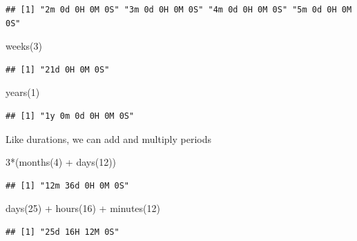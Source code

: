 \documentclass[
]{book}
\newenvironment{Shaded}{\begin{snugshade}}{\end{snugshade}}
\newcommand{\DecValTok}[1]{\textcolor[rgb]{0.00,0.00,0.81}{#1}}
\newcommand{\FunctionTok}[1]{\textcolor[rgb]{0.00,0.00,0.00}{#1}}
\newcommand{\NormalTok}[1]{#1}
\newcommand{\SpecialCharTok}[1]{\textcolor[rgb]{0.00,0.00,0.00}{#1}}
\begin{document}
\begin{verbatim}
## [1] "2m 0d 0H 0M 0S" "3m 0d 0H 0M 0S" "4m 0d 0H 0M 0S" "5m 0d 0H 0M 0S"
\end{verbatim}

\begin{Shaded}
\begin{Highlighting}[]
\FunctionTok{weeks}\NormalTok{(}\DecValTok{3}\NormalTok{)}
\end{Highlighting}
\end{Shaded}

\begin{verbatim}
## [1] "21d 0H 0M 0S"
\end{verbatim}

\begin{Shaded}
\begin{Highlighting}[]
\FunctionTok{years}\NormalTok{(}\DecValTok{1}\NormalTok{)}
\end{Highlighting}
\end{Shaded}

\begin{verbatim}
## [1] "1y 0m 0d 0H 0M 0S"
\end{verbatim}

Like durations, we can add and multiply periods

\begin{Shaded}
\begin{Highlighting}[]
\DecValTok{3}\SpecialCharTok{*}\NormalTok{(}\FunctionTok{months}\NormalTok{(}\DecValTok{4}\NormalTok{) }\SpecialCharTok{+} \FunctionTok{days}\NormalTok{(}\DecValTok{12}\NormalTok{))}
\end{Highlighting}
\end{Shaded}

\begin{verbatim}
## [1] "12m 36d 0H 0M 0S"
\end{verbatim}

\begin{Shaded}
\begin{Highlighting}[]
\FunctionTok{days}\NormalTok{(}\DecValTok{25}\NormalTok{) }\SpecialCharTok{+} \FunctionTok{hours}\NormalTok{(}\DecValTok{16}\NormalTok{) }\SpecialCharTok{+} \FunctionTok{minutes}\NormalTok{(}\DecValTok{12}\NormalTok{)}
\end{Highlighting}
\end{Shaded}

\begin{verbatim}
## [1] "25d 16H 12M 0S"
\end{verbatim}
\end{document}
